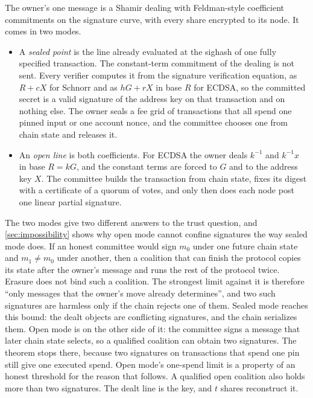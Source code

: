 The owner's one message is a Shamir dealing with Feldman-style coefficient commitments on the signature curve, with every share encrypted to its node. It comes in two modes.

\begin{itemize}[leftmargin=1.5em]
\item A \emph{sealed point} is the line already evaluated at the sighash of one fully specified transaction. The constant-term commitment of the dealing is not sent. Every verifier computes it from the signature verification equation, as $R + cX$ for Schnorr and as $hG + rX$ in base $R$ for ECDSA, so the committed secret is a valid signature of the address key on that transaction and on nothing else. The owner seals a fee grid of transactions that all spend one pinned input or one account nonce, and the committee chooses one from chain state and releases it.
\item An \emph{open line} is both coefficients. For ECDSA the owner deals $k^{-1}$ and $k^{-1}x$ in base $R = kG$, and the constant terms are forced to $G$ and to the address key $X$. The committee builds the transaction from chain state, fixes its digest with a certificate of a quorum of votes, and only then does each node post one linear partial signature.
\end{itemize}

The two modes give two different answers to the trust question, and \cref{sec:impossibility} shows why open mode cannot confine signatures the way sealed mode does. If an honest committee would sign $m_0$ under one future chain state and $m_1 \neq m_0$ under another, then a coalition that can finish the protocol copies its state after the owner's message and runs the rest of the protocol twice. Erasure does not bind such a coalition. The strongest limit against it is therefore ``only messages that the owner's move already determines'', and two such signatures are harmless only if the chain rejects one of them. Sealed mode reaches this bound: the dealt objects are conflicting signatures, and the chain serializes them. Open mode is on the other side of it: the committee signs a message that later chain state selects, so a qualified coalition can obtain two signatures. The theorem stops there, because two signatures on transactions that spend one pin still give one executed spend. Open mode's one-spend limit is a property of an honest threshold for the reason that follows. A qualified open coalition also holds more than two signatures. The dealt line is the key, and $t$ shares reconstruct it.

